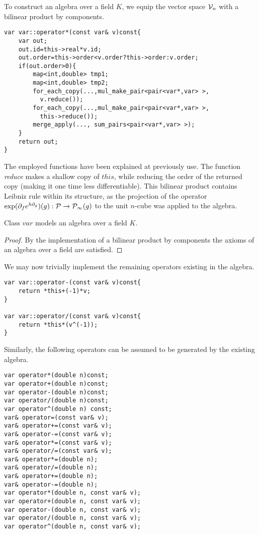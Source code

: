 To construct an algebra over a field $K$, we equip the vector space $\mathcal{V}_n$ with a bilinear product by components.

\begin{lstlisting}
var var::operator*(const var& v)const{
    var out;
    out.id=this->real*v.id;
    out.order=this->order<v.order?this->order:v.order;
    if(out.order>0){
        map<int,double> tmp1;
        map<int,double> tmp2;
        for_each_copy(...,mul_make_pair<pair<var*,var> >, 
          v.reduce());
        for_each_copy(...,mul_make_pair<pair<var*,var> >, 
          this->reduce());
        merge_apply(..., sum_pairs<pair<var*,var> >);
    }
    return out;
}
\end{lstlisting}
The employed functions have been explained at previously use. The function \emph{reduce} makes a shallow copy of $this$, while reducing the order of the returned copy (making it one time less differentiable). This bilinear product contains Leibniz rule within its structure, as the projection of the operator $\exp(\partial_fe^{h\partial_g})(g): \mathcal{P}\to\mathcal{P}_\infty(g)$ to the unit $n$-cube was applied to the algebra.

\begin{izrek}
Class $var$ models an algebra over a field $K$.
\end{izrek}
\begin{proof}
By the implementation of a bilinear product by components the axioms of an algebra over a field are satisfied.
\end{proof}

We may now trivially implement the remaining operators existing in the algebra.

\begin{lstlisting}
var var::operator-(const var& v)const{
    return *this+(-1)*v;
}

var var::operator/(const var& v)const{
    return *this*(v^(-1));
}
\end{lstlisting}
Similarly, the following operators can be assumed to be generated by the existing algebra.

\begin{lstlisting}
var operator*(double n)const;
var operator+(double n)const;
var operator-(double n)const;
var operator/(double n)const;
var operator^(double n) const;
var& operator=(const var& v);
var& operator+=(const var& v);
var& operator-=(const var& v);
var& operator*=(const var& v);
var& operator/=(const var& v);
var& operator*=(double n);
var& operator/=(double n);
var& operator+=(double n);
var& operator-=(double n);
var operator*(double n, const var& v);
var operator+(double n, const var& v);
var operator-(double n, const var& v);
var operator/(double n, const var& v);
var operator^(double n, const var& v);
\end{lstlisting} 

